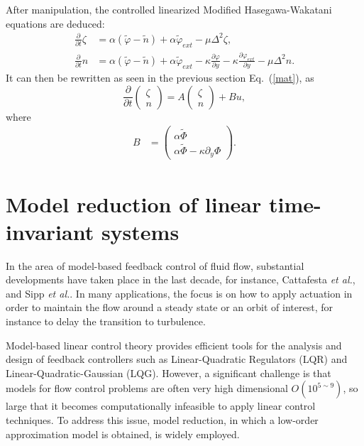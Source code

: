 \documentclass[12pt,lot, lof]{puthesis}
\begin{document}
After manipulation, the controlled linearized Modified Hasegawa-Wakatani equations are deduced:
\begin{subequations}
\begin{align}
	\frac{\partial}{\partial t} \zeta &= \alpha (\tilde{\varphi}-\tilde{n}) +\alpha \tilde{\varphi}_{ext} - \mu \Delta^2 \zeta, \\
	\frac{\partial}{\partial t} n  &= \alpha (\tilde{\varphi}- \tilde{n}) +\alpha \tilde{\varphi}_{ext} -\kappa \frac{\partial \varphi}{\partial y}-\kappa \frac{\partial \varphi_{ext}}{\partial y}- \mu \Delta^2 n.
\end{align}
\end{subequations}
It can then be rewritten as seen in the previous section Eq.~(\ref{mat}), as
%
\begin{equation}
	\frac{\partial}{\partial t} {\left( \begin{matrix} {\zeta} \\ {n} \end{matrix} \right)} =      A {\left( \begin{matrix} {\zeta} \\ {n} \end{matrix} \right)} + B u, 
\end{equation}
where 
%
\begin{align}
\label{init}
	B &= {\left( \begin{matrix} {\alpha \tilde{\Phi}} \\ {\alpha \tilde{\Phi} - \kappa \partial_y \Phi} \end{matrix} \right)} .
\end{align}

\section{Model reduction of linear time-invariant systems}
 \label{ROM}

In the area of  model-based feedback control of fluid flow, substantial developments have taken place in the last decade, for instance, Cattafesta \emph{ et al.}, \cite{Cattafesta, Choi} and Sipp \emph{ et al.}. \cite{Sipp}
In many applications, the focus is on how to apply actuation in order to maintain the flow around a steady state or an orbit of interest, for instance to delay the transition to turbulence.

Model-based linear control theory provides efficient tools for the analysis and design of feedback controllers such as Linear-Quadratic Regulators (LQR) and Linear-Quadratic-Gaussian (LQG). However, a significant challenge is that models for flow control problems are often very high dimensional $O(10^{5 \sim 9})$, so large that it becomes computationally infeasible to apply linear control techniques. To address this issue, model reduction, in which a low-order approximation model is obtained, is widely employed.
\end{document}

